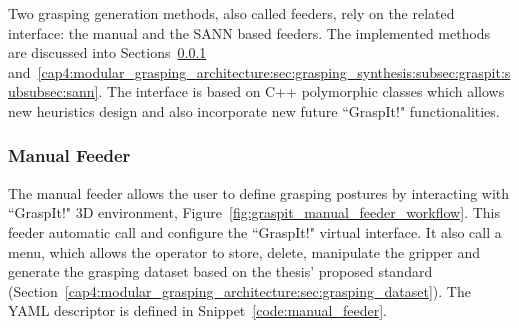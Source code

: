 \begin{figure}[h!]
\end{figure}

Two grasping generation methods, also called feeders, rely on the related interface: the manual and the \ac{SANN} based feeders. The implemented methods are discussed into Sections~\ref{cap4:modular_grasping_architecture:sec:grasping_synthesis:subsec:graspit:subsubsec:manual} and~\ref{cap4:modular_grasping_architecture:sec:grasping_synthesis:subsec:graspit:subsubsec:sann}. The interface is based on C++ polymorphic classes which allows new heuristics design and also incorporate new future ``GraspIt!" functionalities. 

\subsubsection{Manual Feeder}
\label{cap4:modular_grasping_architecture:sec:grasping_synthesis:subsec:graspit:subsubsec:manual}

The manual feeder allows the user to define grasping postures by interacting with ``GraspIt!" 3D environment, Figure~\ref{fig:graspit_manual_feeder_workflow}. This feeder automatic call and configure the ``GraspIt!" virtual interface. It also call a menu, which allows the operator to store, delete, manipulate the gripper and generate the grasping dataset based on the thesis' proposed standard (Section~\ref{cap4:modular_grasping_architecture:sec:grasping_dataset}). The YAML descriptor is defined in Snippet~\ref{code:manual_feeder}. %

